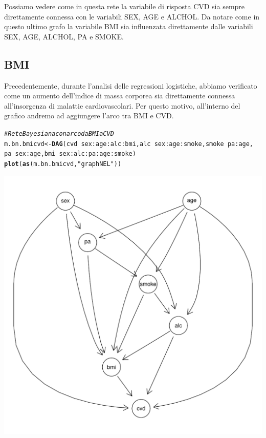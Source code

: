 \documentclass{article}\usepackage[]{graphicx}\usepackage[]{xcolor}
\makeatletter
\def\maxwidth{ %
  \ifdim\Gin@nat@width>\linewidth
    \linewidth
  \else
    \Gin@nat@width
  \fi
}
\newcommand{\hlstr}[1]{\textcolor[rgb]{0.192,0.494,0.8}{#1}}%
\newcommand{\hlcom}[1]{\textcolor[rgb]{0.678,0.584,0.686}{\textit{#1}}}%
\newcommand{\hlopt}[1]{\textcolor[rgb]{0,0,0}{#1}}%
\newcommand{\hlstd}[1]{\textcolor[rgb]{0.345,0.345,0.345}{#1}}%
\newcommand{\hlkwb}[1]{\textcolor[rgb]{0.69,0.353,0.396}{#1}}%
\newcommand{\hlkwd}[1]{\textcolor[rgb]{0.737,0.353,0.396}{\textbf{#1}}}%
\newenvironment{kframe}{%
 \def\at@end@of@kframe{}%
 \ifinner\ifhmode%
  \def\at@end@of@kframe{\end{minipage}}%
  \begin{minipage}{\columnwidth}%
 \fi\fi%
 \def\FrameCommand##1{\hskip\@totalleftmargin \hskip-\fboxsep
 \colorbox{shadecolor}{##1}\hskip-\fboxsep
     \hskip-\linewidth \hskip-\@totalleftmargin \hskip\columnwidth}%
 \MakeFramed {\advance\hsize-\width
   \@totalleftmargin\z@ \linewidth\hsize
   \@setminipage}}%
 {\par\unskip\endMakeFramed%
 \at@end@of@kframe}
\newenvironment{knitrout}{}{} %
\makeatother
\begin{document}
    Possiamo vedere come in questa rete la variabile di risposta CVD sia sempre
    direttamente connessa con le variabili SEX, AGE e ALCHOL. Da notare come in
    questo ultimo grafo la variabile BMI sia influenzata direttamente dalle 
    variabili SEX, AGE, ALCHOL, PA e SMOKE.
  
  \subsection{BMI}
    Precedentemente, durante l'analisi delle regressioni logistiche, abbiamo 
    verificato come un aumento dell'indice di massa corporea sia direttamente 
    connessa all'insorgenza di malattie cardiovascolari. Per questo motivo, 
    all'interno del grafico andremo ad aggiungere l'arco tra BMI e CVD.
    
\begin{knitrout}
\color{fgcolor}\begin{kframe}
\begin{alltt}
\hlcom{#Rete Bayesiana con arco da BMI a CVD}
\hlstd{m.bn.bmicvd} \hlkwb{<-} \hlkwd{DAG}\hlstd{(cvd}\hlopt{~}\hlstd{sex}\hlopt{:}\hlstd{age}\hlopt{:}\hlstd{alc}\hlopt{:}\hlstd{bmi,alc}\hlopt{~}\hlstd{sex}\hlopt{:}\hlstd{age}\hlopt{:}\hlstd{smoke,smoke}\hlopt{~}\hlstd{pa}\hlopt{:}\hlstd{age,}
                   \hlstd{pa}\hlopt{~}\hlstd{sex}\hlopt{:}\hlstd{age, bmi}\hlopt{~}\hlstd{sex}\hlopt{:}\hlstd{alc}\hlopt{:}\hlstd{pa}\hlopt{:}\hlstd{age}\hlopt{:}\hlstd{smoke)}
\hlkwd{plot}\hlstd{(}\hlkwd{as}\hlstd{(m.bn.bmicvd,} \hlstr{"graphNEL"}\hlstd{))}
\end{alltt}
\end{kframe}
\includegraphics[width=\maxwidth]{figure/Rete_Bayesiana_con_arco_BMI_-__CVD-1} 
\end{knitrout}
    
\end{document}
